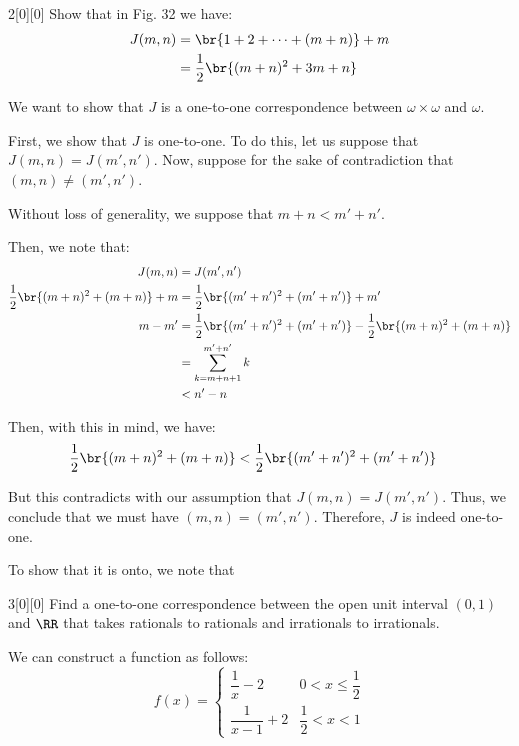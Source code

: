 \documentclass{article}
\begin{document}
\begin{hw}{2}[0][0]
	Show that in Fig. 32 we have:
	\begin{align*}
		J(m,n) &= \br{1 + 2 + \cdots + (m+n)} + m \\
		&= \frac{1}{2}\br{(m+n)^{2} + 3m + n}
	\end{align*}
\end{hw}
\begin{solution}
	\begin{comment}
	First, we observe that the sum $1 + 2 + \cdots + (m+n)$ is equal to:
	\begin{align*}
		1 + 2 + \cdots + (m+n) &= \frac{1}{2}(m+n)(1 + (m+n)) \\
		&= \frac{1}{2}( (m+n) + (m+n)^{2})
	\end{align*}
	\end{comment}
	We want to show that $J$ is a one-to-one correspondence between $\omega \times\omega$ and $\omega$.
	
	First, we show that $J$ is one-to-one. To do this, let us suppose that $J(m,n) = J(m', n')$. Now, suppose for the sake of contradiction that $(m,n) \neq (m', n')$. 
	
	Without loss of generality, we suppose that $m + n < m' + n'$.
	
	Then, we note that:
	\begin{align*}
		J(m,n) &= J(m', n') \\
		\frac{1}{2}\br{(m+n)^{2} + (m+n)} + m &= \dfrac{1}{2}\br{(m'+n')^{2} + (m'+n')} + m' \\
		m - m' &= \dfrac{1}{2}\br{(m'+n')^{2} + (m'+n')} - \frac{1}{2}\br{(m+n)^{2} + (m+n)} \\
		&= \sum_{k=m+n+1}^{m'+n'} k \\
		&< n' - n
	\end{align*}

	Then, with this in mind, we have:
	\begin{align*}
		\frac{1}{2}\br{(m+n)^{2} + (m+n)} &< \dfrac{1}{2}\br{(m'+n')^{2} + (m'+n')}
	\end{align*}

	But this contradicts with our assumption that $J(m,n) = J(m', n')$. Thus, we conclude that we must have $(m,n) = (m', n')$. Therefore, $J$ is indeed one-to-one.
	
	To show that it is onto, we note that 
\end{solution}

\begin{hw}{3}[0][0]
	Find a one-to-one correspondence between the open unit interval $(0,1)$ and $\RR$ that takes rationals to rationals and irrationals to irrationals.
\end{hw}
\begin{solution}
	We can construct a function as follows:
	\begin{equation*}
		f(x) = \begin{cases}
			\dfrac{1}{x} - 2 & 0 < x \leq \dfrac{1}{2} \\
			\dfrac{1}{x-1} + 2 & \dfrac{1}{2} < x < 1
		\end{cases}
	\end{equation*}
\end{solution}
\end{document}
